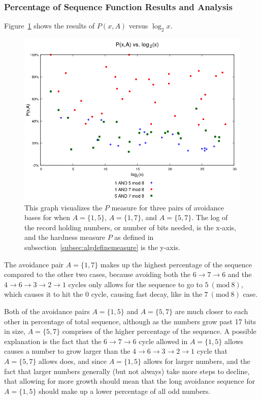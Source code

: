 \documentclass[12pt]{article}
\newcommand{\Mod}[1]{\ (\mathrm{mod}\ #1)}
\theoremstyle{definition}
\begin{document}
\subsubsection{Percentage of Sequence Function Results and Analysis} \label{subsubsec:algmulpercentage}
Figure~\ref{fig:p_multi_vslog} shows the results of $P(x,A)$ versus $\log_2{x}$.\par
\begin{figure}
    \centering
    \includegraphics[scale=0.75]{ModAvoidanceAnalysisPics/P_vs_log_multi_base.png}
    \caption{This graph visualizes the $P$ measure for three pairs of avoidance bases for when $A = \{1,5\}$, $A= \{1,7\}$, and $A = \{5,7\}$. The log of the record holding numbers, or number of bits needed, is the x-axis, and the hardness measure $P$ as defined in subsection~\ref{subsec:algdefinemeasure} is the y-axis.}
    \label{fig:p_multi_vslog}
\end{figure}
The avoidance pair $A= \{1,7\}$ makes up the highest percentage of the sequence compared to the other two cases, because avoiding both the $6 \rightarrow 7 \rightarrow 6$ and the $4 \rightarrow 6 \rightarrow 3 \rightarrow 2 \rightarrow 1$ cycles only allows for the sequence to go to $5\Mod{8}$, which causes it to hit the 0 cycle, causing fast decay, like in the $7\Mod{8}$ case. \par
Both of the avoidance pairs $A= \{1,5\}$ and $A= \{5,7\}$ are much closer to each other in percentage of total sequence, although as the numbers grow past 17 bits in size, $A= \{5,7\}$ comprises of the higher percentage of the sequence. A possible explanation is the fact that the $6 \rightarrow 7 \rightarrow 6$ cycle allowed in $A = \{1,5\}$ allows causes a number to grow larger than the $4 \rightarrow 6 \rightarrow 3 \rightarrow 2 \rightarrow 1$ cycle that $A= \{5,7\}$ allows does, and since $A = \{1,5\}$ allows for larger numbers, and the fact that larger numbers generally (but not always) take more steps to decline, that allowing for more growth should mean that the long avoidance sequence for $A = \{1,5\}$ should make up a lower percentage of all odd numbers.
\end{document}
